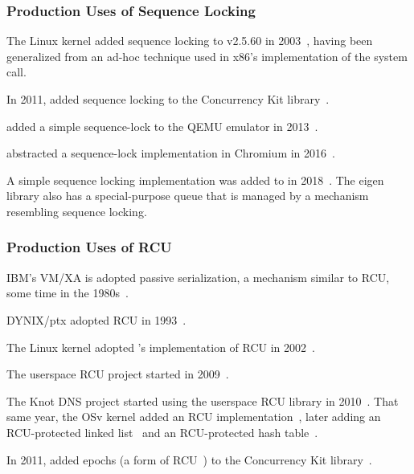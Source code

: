 \subsubsection{Production Uses of Sequence Locking}
\label{sec:defer:Production Uses of Sequence Locking}

The Linux kernel added sequence locking to v2.5.60 in
2003~\cite{JonathanCorbet2003seqlock}, having been generalized from
an ad-hoc technique used in x86's implementation of the
 system call.

In 2011,  added sequence locking to the Concurrency Kit
library~\cite{SamyAlBahra2011ckseqlock}.

 added a simple sequence-lock to the QEMU emulator in
2013~\cite{PaoloBonzini2013QEMUseqlock}.

 abstracted a sequence-lock implementation in Chromium
in 2016~\cite{AlexisMenard2016ChromiumSeqLock}.

A simple sequence locking implementation was added to 
in 2018~\cite{DavidGoldblatt2018seqlock}.
The eigen library also has a special-purpose queue that is managed by
a mechanism resembling sequence locking.

\subsubsection{Production Uses of RCU}
\label{sec:defer:Production Uses of RCU}

IBM's VM/XA is adopted passive serialization, a mechanism similar to
RCU, some time in the 1980s~\cite{Hennessy89}.

DYNIX/ptx adopted RCU in 1993~\cite{McKenney98,Slingwine95}.

The Linux kernel adopted 's implementation of RCU in
2002~\cite{Torvalds2.5.43}.

The userspace RCU project started in 2009~\cite{MathieuDesnoyers2009URCU}.

The Knot DNS project started using the userspace RCU
library in 2010~\cite{LubosSlovak2010KnotDNSRCU}.
That same year, the OSv kernel added an RCU
implementation~\cite{AviKivity2013OSvRCU},
later adding an RCU-protected linked list~\cite{AviKivity2013OSvRCUlist}
and an RCU-protected hash table~\cite{AviKivity2013OSvRCUhash}.

In 2011,  added epochs
(a form of RCU~\cite{UCAM-CL-TR-579,KeirFraser2007withoutLocks})
to the Concurrency Kit
library~\cite{SamyAlBahra2011ckEpoch}.

